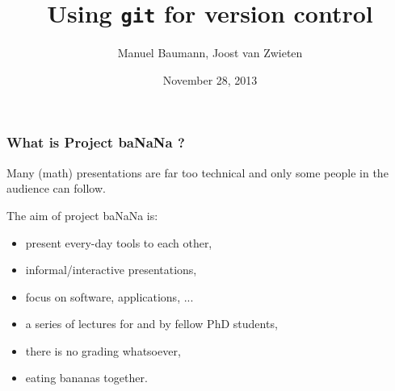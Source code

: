 \documentclass{beamer}
\title{\huge{Using \texttt{git} for version control}}
\author{Manuel Baumann, Joost van Zwieten}
\date{\footnotesize{November 28, 2013}}
\begin{document}
\frame{\titlepage}
\begin{frame}
\frametitle{What is Project baNaNa ?}
Many (math) presentations are far too technical and only some people in the audience can follow.

The aim of project ba\color{red}NaN\color{black}a is:
\begin{itemize}
 \item present every-day tools to each other,
 \pause
 \item informal/interactive presentations,
 \pause
 \item focus on software, applications, ...
 \pause
 \item a series of lectures for and by fellow PhD students,
 \pause
 \item there is no grading whatsoever, 
 \pause
 \item eating bananas together.
\end{itemize}
\end{frame}
\end{document}
